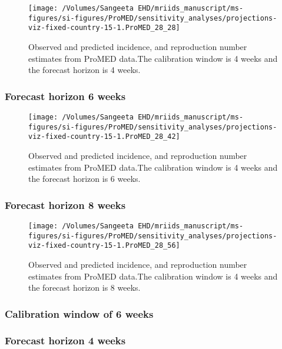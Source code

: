 \documentclass[9pt,twoside,lineno]{pnas-new}
\begin{document}
\begin{figure}
    \centering \texttt{[image: /Volumes/Sangeeta EHD/mriids\_manuscript/ms-figures/si-figures/ProMED/sensitivity\_analyses/projections-viz-fixed-country-15-1.ProMED\_28\_28]} 
  \caption{Observed and predicted incidence, and reproduction number
    estimates from ProMED data.The calibration window is 4 weeks and
    the forecast horizon is 4 weeks.}
  \label{fig:pm44ul10}
\end{figure}\FloatBarrier

\subsubsection{Forecast horizon 6 weeks}\label{forecast-horizon-6-weeks-10}

\begin{figure}
  \centering \texttt{[image: /Volumes/Sangeeta EHD/mriids\_manuscript/ms-figures/si-figures/ProMED/sensitivity\_analyses/projections-viz-fixed-country-15-1.ProMED\_28\_42]} 
  \caption{Observed and predicted incidence, and reproduction number
    estimates from ProMED data.The calibration window is 4 weeks and
    the forecast horizon is 6 weeks.}
  \label{fig:pm46ul10}
\end{figure}\FloatBarrier


\subsubsection{Forecast horizon 8 weeks}\label{forecast-horizon-8-weeks-10}
\begin{figure}
  \centering
    \texttt{[image: /Volumes/Sangeeta EHD/mriids\_manuscript/ms-figures/si-figures/ProMED/sensitivity\_analyses/projections-viz-fixed-country-15-1.ProMED\_28\_56]} 
  \caption{Observed and predicted incidence, and reproduction number
    estimates from ProMED data.The calibration window is 4 weeks and
    the forecast horizon is 8 weeks.}
  \label{fig:pm48ul10}
\end{figure}\FloatBarrier


\subsubsection{Calibration window of 6 weeks}\label{calibration-window-of-6-weeks-3}


\subsubsection{Forecast horizon 4 weeks}\label{forecast-horizon-4-weeks-10}
\end{document}
